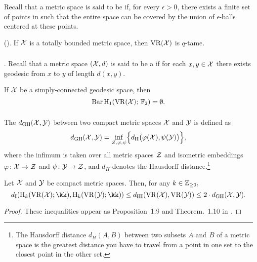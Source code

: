 \subsubsection{}
Recall that a metric space is said to be  if, for every $\epsilon > 0$, there exists a finite set of points in such that the entire space can be covered by the union of $\epsilon$-balls centered at these points.

\medskip\lemma(\cite[Prop.~5.1]{chazal2014geometric}).
If $\cX$ is a totally bounded metric space, then $\VR(\cX)$ is $q$-tame.

\subsubsection{}\label{prop:pH1}{\rm \cite[Prop.~7.10]{virk20201}}.
Recall that a metric space $(\cX, d)$ is said to be a  if for each $x, y \in \cX$ there exists geodesic from $x$ to $y$ of length $d(x, y)$.
 
\medskip\lemma If $\cX$ be a simply-connected geodesic space, then
\[
\Hbarc{1}{\cX} = \emptyset.
\]

\subsubsection{}\label{thm:stability-HI}
The  $\dgh(\cX, \cY)$ between two compact metric spaces $\cX$ and $\cY$ is defined as
\[
\dgh(\cX, \cY) = \inf_{\cZ, \varphi, \psi} \set[\Big]{d_\rH\big(\varphi(\cX), \psi(\cY)\big)},
\]
where the infimum is taken over all metric spaces $\cZ$ and isometric embeddings $\varphi \colon \cX \to \cZ$ and $\psi \colon \cY \to \cZ$, and $d_H$ denotes the Hausdorff distance.\footnote{
The Hausdorff distance $d_H(A, B)$ between two subsets $A$ and $B$ of a metric space is the greatest distance you have to travel from a point in one set to the closest point in the other set.
}

\medskip\theorem Let $\cX$ and $\cY$ be compact metric spaces.
Then, for any $k \in \Z_{\geq 0},$
\[
\di(\rH_k(\VR(\cX); \kk), \rH_k(\VR(\cY); \kk)) \leq
\dhi(\VR(\cX), \VR(\cY)) \leq
2 \cdot \dgh(\cX, \cY).
\]

\begin{proof}
	These inequalities appear as Proposition~1.9 and Theorem.~1.10 in \cite{blumberg2023interleaving}.
\end{proof}


